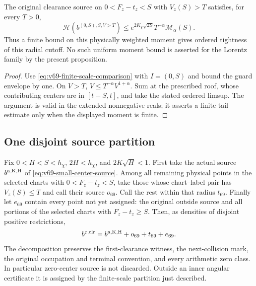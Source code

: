 \begin{proposition}
\label{prop:v69-radial-tail-transfer}
The original clearance source on $0<F_z-t_z<S$ with $V_z(S)>T$
satisfies, for every $T>0$,
\begin{equation}\label{eq:v69-radial-tail-transfer}
 \mathcal H(b^{(0,S),S,V>T})
 \le e^{2K_\chi\sqrt{2S}}T^{-\alpha}\mathcal M_\alpha(S).
\end{equation}
Thus a finite bound on this physically weighted moment gives ordered
tightness of this radial cutoff. No such uniform moment bound is
asserted for the Lorentz family by the present proposition.
\end{proposition}
\begin{proof}
Use \eqref{eq:v69-finite-scale-comparison} with $I=(0,S)$ and
bound the guard envelope by one. On $V>T$,
$V\le T^{-\alpha}V^{1+\alpha}$. Sum at the prescribed roof, whose
contributing centers are in $[t-S,t]$, and take the stated ordered
limsup. The argument is valid in the extended nonnegative reals;
it asserts a finite tail estimate only when the displayed moment
is finite.
\end{proof}

\subsection{One disjoint source partition}
Fix $0<H<S<h_\chi$, $2H<h_\chi$, and $2K\sqrt H<1$.
First take the actual source $b^{\rm a,K,H}$ of
\eqref{eq:v69-small-center-source}. Among all remaining physical
points in the selected charts with $0<F_z-t_z<S$, take those whose
chart--label pair has $V_z(S)\le T$ and call their source $o_{69}$.
Call the rest within that radius $t_{69}$. Finally let $e_{69}$
contain every point not yet assigned: the original outside source
and all portions of the selected charts with $F_z-t_z\ge S$.
Then, as densities of disjoint positive restrictions,
\begin{equation}\label{eq:v69-complete-positive-partition}
 b^{\varepsilon,\mathrm{clr}}
            =b^{\rm a,K,H}+o_{69}+t_{69}+e_{69}.
\end{equation}
The decomposition preserves the first-clearance witness, the
next-collision mark, the original occupation and terminal convention,
and every arithmetic zero class. In particular zero-center source
is not discarded. Outside an inner angular certificate it is assigned
by the finite-scale partition just described.

